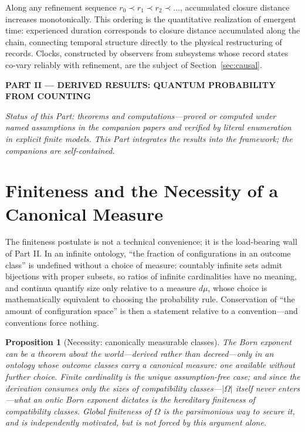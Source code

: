 \documentclass[11pt]{article}
\newtheorem{proposition}{Proposition}
\theoremstyle{definition}
\theoremstyle{remark}
\newcommand{\partheader}[1]{\clearpage\begin{center}{\LARGE\bfseries #1}\end{center}\vspace{1em}}
\begin{document}
Along any refinement sequence $r_0 \prec r_1 \prec r_2 \prec \dots$, accumulated closure distance increases monotonically. This ordering is the quantitative realization of emergent time: experienced duration corresponds to closure distance accumulated along the chain, connecting temporal structure directly to the physical restructuring of records. Clocks, constructed by observers from subsystems whose record states co-vary reliably with refinement, are the subject of Section~\ref{sec:causal}.
\partheader{PART II --- DERIVED RESULTS: QUANTUM PROBABILITY FROM COUNTING}
\emph{Status of this Part: theorems and computations---proved or computed under named assumptions in the companion papers \cite{TillittBorn,TillittCHSH,TillittSchr} and verified by literal enumeration in explicit finite models. This Part integrates the results into the framework; the companions are self-contained.}

\section{Finiteness and the Necessity of a Canonical Measure}\label{sec:necessity}
The finiteness postulate is not a technical convenience; it is the load-bearing wall of Part II. In an infinite ontology, ``the fraction of configurations in an outcome class'' is undefined without a choice of measure: countably infinite sets admit bijections with proper subsets, so ratios of infinite cardinalities have no meaning, and continua quantify size only relative to a measure $d\mu$, whose choice is mathematically equivalent to choosing the probability rule. Conservation of ``the amount of configuration space'' is then a statement relative to a convention---and conventions force nothing.

\begin{proposition}[Necessity: canonically measurable classes]\label{prop:necessity}
The Born exponent can be a theorem about the world---derived rather than decreed---only in an ontology whose outcome classes carry a canonical measure: one available without further choice. Finite cardinality is the unique assumption-free case; and since the derivation consumes only the sizes of compatibility classes---$|\Omega|$ itself never enters---what an ontic Born exponent dictates is the hereditary finiteness of compatibility classes. Global finiteness of $\Omega$ is the parsimonious way to secure it, and is independently motivated, but is not forced by this argument alone.
\end{proposition}
\end{document}

